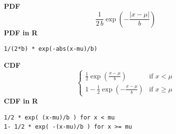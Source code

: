 \smallskip \noindent \hspace{.2cm} \textbf{PDF} 
\begin{equation*}\frac{1}{2\,b} \exp \left(-\frac{|x-\mu|}b \right)\end{equation*}
\smallskip \noindent \hspace{.2cm} \textbf{PDF in R}  
\begin{verbatim}1/(2*b) * exp(-abs(x-mu)/b)\end{verbatim}
\smallskip \noindent \hspace{.2cm} \textbf{CDF} 
\begin{equation*}\begin{cases}
      \frac12 \exp \left( \frac{x-\mu}{b} \right) & \mbox{if }x < \mu
             \\[8pt]
          1-\frac12 \exp \left( -\frac{x-\mu}{b} \right) & \mbox{if }x \geq \mu
       \end{cases}\end{equation*}
\smallskip \noindent \hspace{.2cm} \textbf{CDF in R}  
\begin{verbatim}
1/2 * exp( (x-mu)/b ) for x < mu
1- 1/2 * exp( -(x-mu)/b ) for x >= mu
\end{verbatim}

